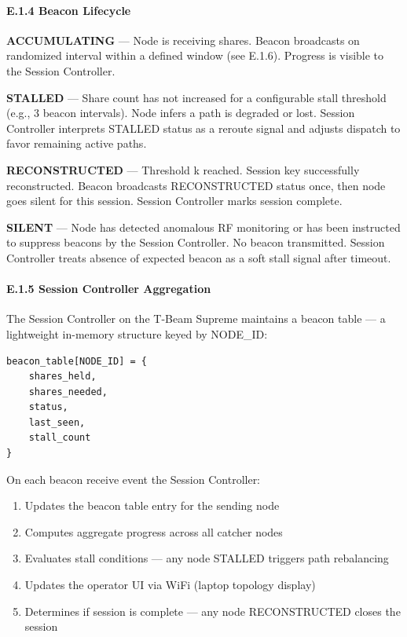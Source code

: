 \documentclass[
  11pt,
]{article}
\providecommand{\tightlist}{%
  \setlength{\itemsep}{0pt}\setlength{\parskip}{0pt}}
\begin{document}
\hypertarget{e.1.4-beacon-lifecycle}{%
\paragraph{E.1.4 Beacon Lifecycle}\label{e.1.4-beacon-lifecycle}}

\textbf{ACCUMULATING} --- Node is receiving shares. Beacon broadcasts on
randomized interval within a defined window (see E.1.6). Progress is
visible to the Session Controller.

\textbf{STALLED} --- Share count has not increased for a configurable
stall threshold (e.g., 3 beacon intervals). Node infers a path is
degraded or lost. Session Controller interprets STALLED status as a
reroute signal and adjusts dispatch to favor remaining active paths.

\textbf{RECONSTRUCTED} --- Threshold k reached. Session key successfully
reconstructed. Beacon broadcasts RECONSTRUCTED status once, then node
goes silent for this session. Session Controller marks session complete.

\textbf{SILENT} --- Node has detected anomalous RF monitoring or has
been instructed to suppress beacons by the Session Controller. No beacon
transmitted. Session Controller treats absence of expected beacon as a
soft stall signal after timeout.

\hypertarget{e.1.5-session-controller-aggregation}{%
\paragraph{E.1.5 Session Controller
Aggregation}\label{e.1.5-session-controller-aggregation}}

The Session Controller on the T-Beam Supreme maintains a beacon table
--- a lightweight in-memory structure keyed by NODE\_ID:

\begin{verbatim}
beacon_table[NODE_ID] = {
    shares_held,
    shares_needed,
    status,
    last_seen,
    stall_count
}
\end{verbatim}

On each beacon receive event the Session Controller:

\begin{enumerate}
\def\labelenumi{\arabic{enumi}.}
\tightlist
\item
  Updates the beacon table entry for the sending node
\item
  Computes aggregate progress across all catcher nodes
\item
  Evaluates stall conditions --- any node STALLED triggers path
  rebalancing
\item
  Updates the operator UI via WiFi (laptop topology display)
\item
  Determines if session is complete --- any node RECONSTRUCTED closes
  the session
\end{enumerate}
\end{document}
